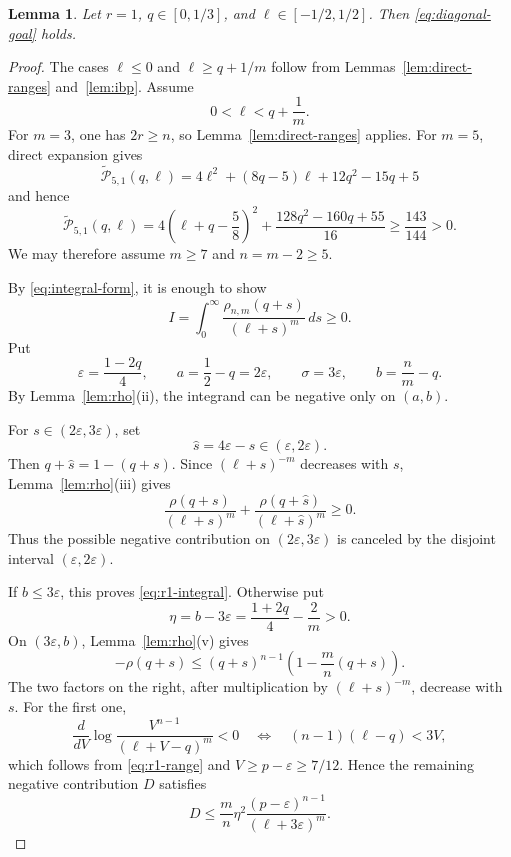 \documentclass[11pt]{article}
\numberwithin{equation}{section}
\newtheorem{lemma}[theorem]{Lemma}
\newcommand{\wtP}{\widetilde{\mathcal P}}
\newcommand{\eps}{\varepsilon}
\begin{document}
\begin{lemma}\label{lem:r-one}
Let $r=1$, $q\in[0,1/3]$, and $\ell\in[-1/2,1/2]$. Then \eqref{eq:diagonal-goal} holds.
\end{lemma}

\begin{proof}
The cases $\ell\le0$ and $\ell\ge q+1/m$ follow from Lemmas~\ref{lem:direct-ranges} and~\ref{lem:ibp}. Assume
\begin{equation}\label{eq:r1-range}
        0<\ell<q+\frac1m.
\end{equation}
For $m=3$, one has $2r\ge n$, so Lemma~\ref{lem:direct-ranges} applies. For $m=5$, direct expansion gives
\[
 \wtP_{5,1}(q,\ell)
 =4\ell^2+(8q-5)\ell+12q^2-15q+5
\]
and hence
\[
 \wtP_{5,1}(q,\ell)
 =4\left(\ell+q-\frac58\right)^2
 +\frac{128q^2-160q+55}{16}
 \ge\frac{143}{144}>0.
\]
We may therefore assume $m\ge7$ and $n=m-2\ge5$.

By \eqref{eq:integral-form}, it is enough to show
\begin{equation}\label{eq:r1-integral}
        I=\int_0^\infty\frac{\rho_{n,m}(q+s)}{(\ell+s)^m}\,ds\ge0.
\end{equation}
Put
\[
 \eps=\frac{1-2q}{4},
 \qquad a=\frac12-q=2\eps,
 \qquad \sigma=3\eps,
 \qquad b=\frac nm-q.
\]
By Lemma~\ref{lem:rho}(ii), the integrand can be negative only on $(a,b)$.

For $s\in(2\eps,3\eps)$, set
\[
        \widehat s=4\eps-s\in(\eps,2\eps).
\]
Then $q+\widehat s=1-(q+s)$. Since $(\ell+s)^{-m}$ decreases with $s$, Lemma~\ref{lem:rho}(iii) gives
\[
 \frac{\rho(q+s)}{(\ell+s)^m}
 +\frac{\rho(q+\widehat s)}{(\ell+\widehat s)^m}\ge0.
\]
Thus the possible negative contribution on $(2\eps,3\eps)$ is canceled by the disjoint interval $(\eps,2\eps)$.

If $b\le3\eps$, this proves \eqref{eq:r1-integral}. Otherwise put
\[
        \eta=b-3\eps=\frac{1+2q}{4}-\frac2m>0.
\]
On $(3\eps,b)$, Lemma~\ref{lem:rho}(v) gives
\[
        -\rho(q+s)\le(q+s)^{n-1}
        \left(1-\frac mn(q+s)\right).
\]
The two factors on the right, after multiplication by $(\ell+s)^{-m}$, decrease with $s$. For the first one,
\[
 \frac{d}{dV}\log\frac{V^{n-1}}{(\ell+V-q)^m}<0
 \quad\Longleftrightarrow\quad
 (n-1)(\ell-q)<3V,
\]
which follows from \eqref{eq:r1-range} and $V\ge p-\eps\ge7/12$. Hence the remaining negative contribution $D$ satisfies
\begin{equation}\label{eq:r1-D}
        D\le\frac mn\eta^2
        \frac{(p-\eps)^{n-1}}{(\ell+3\eps)^m}.
\end{equation}


\end{proof}
\end{document}
